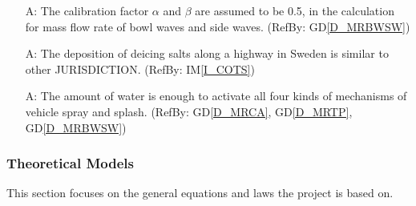 \documentclass[12pt]{article}
\newcommand{\dref}[1]{GD\ref{#1}}
\newcounter{assumpnum} %
\newcommand{\iref}[1]{IM\ref{#1}}
\begin{document}
\begin{itemize}
\item[A\refstepcounter{assumpnum}\theassumpnum \label{A_Calibration}:] The calibration factor $\alpha$ and $\beta$ are assumed to be 0.5, in the calculation for mass flow rate of bowl waves and side waves. (RefBy: \dref{D_MRBWSW})

\item[A\refstepcounter{assumpnum}\theassumpnum \label{A_deicingSaltsDeposition}:] The deposition of deicing salts along a highway in Sweden is similar to other JURISDICTION. (RefBy: \iref{I_COTS})

\item[A\refstepcounter{assumpnum}\theassumpnum \label{A_fourMechanisms}:] The amount of water is enough to activate all four kinds of mechanisms of vehicle spray and splash. (RefBy: \dref{D_MRCA}, \dref{D_MRTP}, \dref{D_MRBWSW})

\end{itemize}

\subsubsection{Theoretical Models}\label{sec_theoretical}
This section focuses on the general equations and laws the project is based on. 
\newline
\noindent
\end{document}
